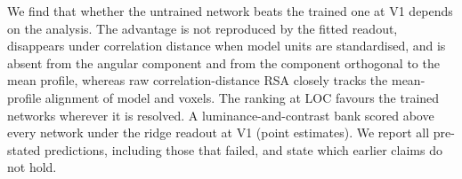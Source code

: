 We find that whether the untrained network beats the trained one at V1 depends on the
analysis. The advantage is not reproduced by the fitted readout, disappears under
correlation distance when model units are standardised, and is absent from the angular
component and from the component orthogonal to the mean profile, whereas raw
correlation-distance RSA closely tracks the mean-profile alignment of model and voxels.
The ranking at LOC favours the trained networks wherever it is resolved. A luminance-and-contrast bank scored above every network under the ridge readout at V1 (point estimates). We
report all pre-stated predictions, including those that failed, and state which earlier claims
\citep{evalres, lrrsa} do not hold.
